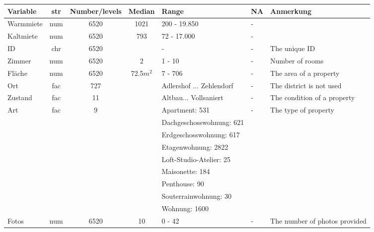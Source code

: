 \begin{landscape}
	\begin{tabular}{|l||c|c|c|l|l|l|} \hline
		Variable         & str  & Number/levels & Median	    	& Range                          & NA & Anmerkung\\ \hline \hline
		Warmmiete      	 & num  & 6520                & 1021      	& 200 - 19.850             & - & \\  \hline
		Kaltmiete      	 & num  & 6520                & 793      	& 72 - 17.000              & - & \\   \hline
		ID               & chr  & 6520                &			    	& -                              & - & The unique ID \\ \hline
		Zimmer           & num  & 6520                & 2  	    	& 1 - 10                         &-  & Number of rooms\\ \hline
		Fläche           & num  & 6520                &	72.5$m^2$    	& 7 - 706                    & - & The area of a property\\ \hline
		Ort      		 & fac	& 727                  &				    & Adlershof ... Zehlendorf       & - & The district is not used \\ \hline
		Zustand    		 & fac	& 11                  &				    & Altbau... Vollsaniert          & - & The condition of a property  \\ \hline
		Art              & fac  & 9                   &    				& Apartment: 531                 & - & The type of property\\ 
		&      &                     &	    			& Dachgeschosswohnung: 621       & &\\
		&      &                     &    				& Erdgeschosswohnung: 617        & &\\
		&      &                     &    				& Etagenwohnung: 2822          & &\\
		&      &                     &	    			& Loft-Studio-Atelier: 25        & &\\
		&      &                     &	    			& Maisonette: 184                & &\\
		&      &                     &	    			& Penthouse: 90                 & &\\
		&      &                     &	    			& Souterrainwohnung: 30          & &\\
		&      &                     &	    			& Wohnung: 1600                   & &\\ \hline
		Fotos 		    & num  & 6520                &	10	    		& 0 - 42                         & - & The number of photos provided \\ \hline

\end{tabular}
\end{landscape}
